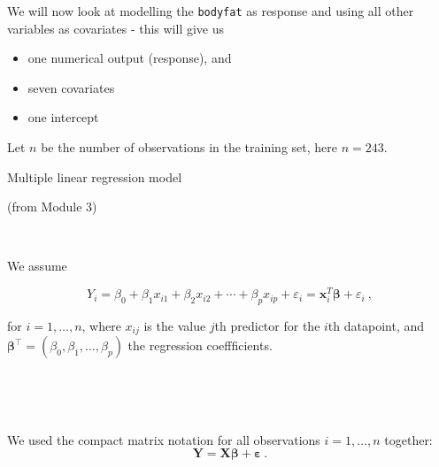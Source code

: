 \documentclass[10pt,ignorenonframetext,]{beamer}
\providecommand{\tightlist}{%
  \setlength{\itemsep}{0pt}\setlength{\parskip}{0pt}}
\begin{document}
\begin{frame}[fragile]

We will now look at modelling the \texttt{bodyfat} as response and using
all other variables as covariates - this will give us

\begin{itemize}
\tightlist
\item
  one numerical output (response), and
\item
  seven covariates
\item
  one intercept
\end{itemize}

Let \(n\) be the number of observations in the training set, here
\(n=243\).

\end{frame}

\begin{frame}

\begin{block}{Multiple linear regression model}

(from Module 3)

\(~\)

We assume

\begin{equation}
 Y_i=\beta_0 + \beta_1 x_{i1}+\beta_2 x_{i2}+\cdots + \beta_p x_{ip}+\varepsilon_i={\boldsymbol x}_i^T{\boldsymbol \beta}+\varepsilon_i \ ,
\end{equation}

for \(i=1,\ldots,n\), where \(x_{ij}\) is the value \(j\)th predictor
for the \(i\)th datapoint, and
\(\boldsymbol{\beta}^\top = (\beta_0,\beta_1,\ldots,\beta_p)\) the
regression coeffficients.

\(~\)

\(~\)

We used the compact matrix notation for all observations
\(i=1,\ldots,n\) together:
\[{\boldsymbol Y}={\boldsymbol {X}} \boldsymbol{\beta}+{\boldsymbol{\varepsilon}}  \ .\]

\end{block}

\end{frame}
\end{document}
